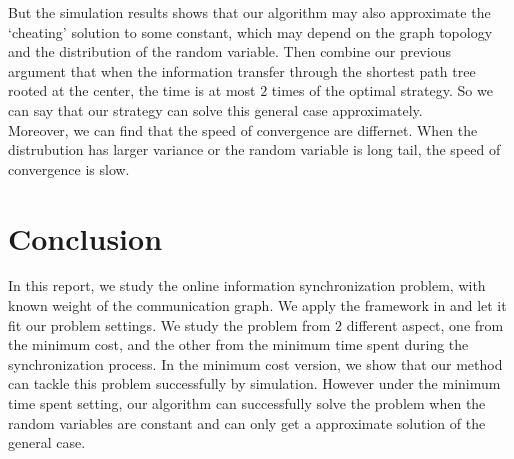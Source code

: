 \documentclass{article}
\theoremstyle{plain}
\theoremstyle{definition}
\theoremstyle{remark}
\begin{document}
    But the simulation results shows that our algorithm may also approximate the `cheating' solution to some constant, which may depend on the graph topology and the distribution of the random variable. Then combine our previous argument that when the information transfer through the shortest path tree rooted at the center, the time is at most $2$ times of the optimal strategy. So we can say that our strategy can solve this general case approximately.\\

    Moreover, we can find that the speed of convergence are differnet. When the distrubution has larger variance or the random variable is long tail, the speed of convergence is slow.

    \section{Conclusion}
    In this report, we study the online information synchronization problem, with known weight of the communication graph. We apply the framework in \cite{chen2013combinatorial} and let it fit our problem settings. We study the problem from $2$ different aspect, one from the minimum cost, and the other from the minimum time spent during the synchronization process. In the minimum cost version, we show that our method can tackle this problem successfully by simulation. However under the minimum time spent setting, our algorithm can successfully solve the problem when the random variables are constant and can only get a approximate solution of the general case.

    \newpage
    
    

    
    
\end{document}
